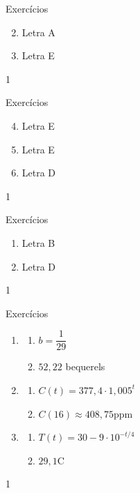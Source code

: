 \clearmargin
\begin{answer}{Exercícios}
{\exerciselist
	\begin{enumerate}\setcounter{enumi}{1}
	\item Letra A
	\item Letra E
	\end{enumerate}
}{1}
\end{answer}
\clearmargin
\begin{answer}{Exercícios}
{\exerciselist
	\begin{enumerate}\setcounter{enumi}{3}
	\item Letra E
	\item Letra E
	\item Letra D
	\end{enumerate}
}{1}
\end{answer}
\clearmargin
\begin{answer}{Exercícios}
{\exerciselist
	\begin{enumerate}
	\item Letra B
	\item Letra D
	\end{enumerate}
}{1}
\end{answer}
\clearmargin
\begin{answer}{Exercícios}
{\exerciselist
	\begin{enumerate}
	\item 
	\begin{enumerate}
	\item $b=\dfrac{1}{29}$
	\item $52{,}22$ bequerels
	\end{enumerate}
	\item 
	\begin{enumerate}
	\item $C(t)=377{,}4\cdot 1{,}005^t$
	\item $C(16)\approx408{,}75$ppm
	\end{enumerate}
	\item
	\begin{enumerate}
	\item $T(t)=30-9\cdot10^{-t/4}$
	\item $29{,}1$\super{${\circ}$}C
	\end{enumerate}
	\end{enumerate}
}{1}
\end{answer}
\exercise 


